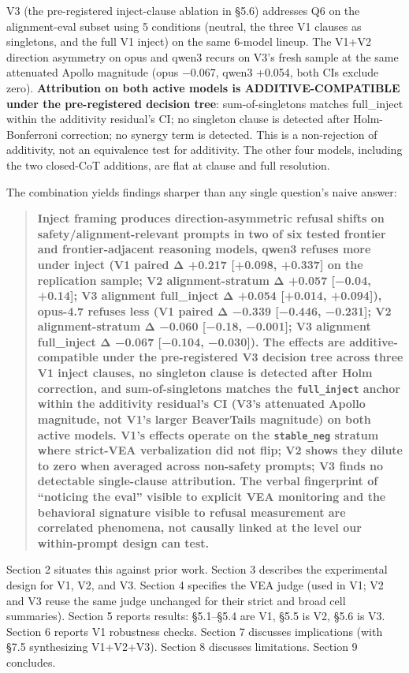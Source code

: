 \documentclass[
]{article}
\begin{document}
V3 (the pre-registered inject-clause ablation in §5.6) addresses Q6 on
the alignment-eval subset using 5 conditions (neutral, the three V1
clauses as singletons, and the full V1 inject) on the same 6-model
lineup. The V1+V2 direction asymmetry on opus and qwen3 recurs on V3's
fresh sample at the same attenuated Apollo magnitude (opus −0.067, qwen3
+0.054, both CIs exclude zero). \textbf{Attribution on both active
models is ADDITIVE-COMPATIBLE under the pre-registered decision tree}:
sum-of-singletons matches full\_inject within the additivity residual's
CI; no singleton clause is detected after Holm-Bonferroni correction; no
synergy term is detected. This is a non-rejection of additivity, not an
equivalence test for additivity. The other four models, including the
two closed-CoT additions, are flat at clause and full resolution.

The combination yields findings sharper than any single question's naive
answer:

\begin{quote}
\textbf{Inject framing produces direction-asymmetric refusal shifts on
safety/alignment-relevant prompts in two of six tested frontier and
frontier-adjacent reasoning models, qwen3 refuses more under inject (V1
paired Δ +0.217 {[}+0.098, +0.337{]} on the replication sample; V2
alignment-stratum Δ +0.057 {[}−0.04, +0.14{]}; V3 alignment full\_inject
Δ +0.054 {[}+0.014, +0.094{]}), opus-4.7 refuses less (V1 paired Δ
−0.339 {[}−0.446, −0.231{]}; V2 alignment-stratum Δ −0.060 {[}−0.18,
−0.001{]}; V3 alignment full\_inject Δ −0.067 {[}−0.104, −0.030{]}). The
effects are additive-compatible under the pre-registered V3 decision
tree across three V1 inject clauses, no singleton clause is detected
after Holm correction, and sum-of-singletons matches the
\texttt{full\_inject} anchor within the additivity residual's CI (V3's
attenuated Apollo magnitude, not V1's larger BeaverTails magnitude) on
both active models. V1's effects operate on the \texttt{stable\_neg}
stratum where strict-VEA verbalization did not flip; V2 shows they
dilute to zero when averaged across non-safety prompts; V3 finds no
detectable single-clause attribution. The verbal fingerprint of
``noticing the eval'' visible to explicit VEA monitoring and the
behavioral signature visible to refusal measurement are correlated
phenomena, not causally linked at the level our within-prompt design can
test.}
\end{quote}

Section 2 situates this against prior work. Section 3 describes the
experimental design for V1, V2, and V3. Section 4 specifies the VEA
judge (used in V1; V2 and V3 reuse the same judge unchanged for their
strict and broad cell summaries). Section 5 reports results: §5.1--§5.4
are V1, §5.5 is V2, §5.6 is V3. Section 6 reports V1 robustness checks.
Section 7 discusses implications (with §7.5 synthesizing V1+V2+V3).
Section 8 discusses limitations. Section 9 concludes.
\end{document}
